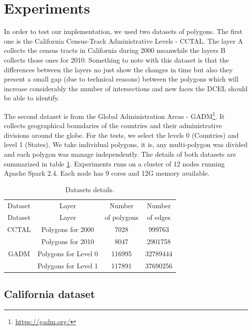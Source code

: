 \section{Experiments}

In order to test our implementation, we used two datasets of polygons.  The first one is the California Census-Track Administrative Levels - CCTAL. The layer A collects the census tracts in California during 2000 meanwhile the layers B collects those ones for 2010.  Something to note with this dataset is that the differences between the layers no just show the changes in time but also they present a small gap (due to technical reasons) between the polygons which will increase considerably the number of intersections and new faces the DCEL should be able to identify.

The second dataset is from the Global Administration Areas - GADM\footnote{\url{https://gadm.org/}}. It collects geographical boundaries of the countries and their administrative divisions around the globe.  For the tests, we select the levels 0 (Countries) and level 1 (States). We take individual polygons, it is, any multi-polygon was divided and each polygon was manage independently. The details of both datasets are summarized in table \ref{tab:datasets}.  Experiments runs on a cluster of 12 nodes running Apache Spark 2.4.  Each node has 9 cores and 12G memory available.

\begin{table}[!ht]
    \caption{Datasets details.}
    \label{tab:datasets}
    \begin{tabular}{c c c c}
        \toprule
        Dataset & Layer & Number        & Number    \\
        Dataset & Layer & of polygons   & of edges  \\
        \midrule
        CCTAL & Polygons for 2000 & 7028 & 999763  \\
              & Polygons for 2010 & 8047 & 2901758 \\
        GADM  & Polygons for Level 0 & 116995 & 32789444 \\
              & Polygons for Level 1 & 117891 & 37690256 \\
        \bottomrule
    \end{tabular}
\end{table}

\subsection{California dataset}

